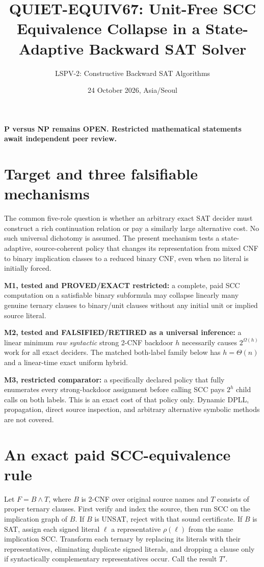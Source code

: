 \documentclass[11pt]{article}
\title{QUIET-EQUIV67: Unit-Free SCC Equivalence Collapse in a State-Adaptive Backward SAT Solver}
\author{LSPV-2: Constructive Backward SAT Algorithms}
\date{24 October 2026, Asia/Seoul}
\begin{document}
\maketitle
\begin{center}\textbf{P versus NP remains OPEN. Restricted mathematical statements await independent peer review.}\end{center}

\section{Target and three falsifiable mechanisms}
The common five-role question is whether an arbitrary exact SAT decider must construct a rich continuation relation or pay a similarly large alternative cost. No such universal dichotomy is assumed. The present mechanism tests a state-adaptive, source-coherent policy that changes its representation from mixed CNF to binary implication classes to a reduced binary CNF, even when no literal is initially forced.

\noindent\textbf{M1, tested and PROVED/EXACT restricted:} a complete, paid SCC computation on a satisfiable binary subformula may collapse linearly many genuine ternary clauses to binary/unit clauses without any initial unit or implied source literal.

\noindent\textbf{M2, tested and FALSIFIED/RETIRED as a universal inference:} a linear minimum \emph{raw syntactic} strong 2-CNF backdoor $h$ necessarily causes $2^{\Omega(h)}$ work for all exact deciders. The matched both-label family below has $h=\Theta(n)$ and a linear-time exact uniform hybrid.

\noindent\textbf{M3, restricted comparator:} a specifically declared policy that fully enumerates every strong-backdoor assignment before calling SCC pays $2^h$ child calls on both labels. This is an exact cost of that policy only. Dynamic DPLL, propagation, direct source inspection, and arbitrary alternative symbolic methods are not covered.

\section{An exact paid SCC-equivalence rule}
Let $F=B\wedge T$, where $B$ is 2-CNF over original source names and $T$ consists of proper ternary clauses. First verify and index the source, then run SCC on the implication graph of $B$. If $B$ is UNSAT, reject with that sound certificate. If $B$ is SAT, assign each signed literal $\ell$ a representative $\rho(\ell)$ from the same implication SCC. Transform each ternary by replacing its literals with their representatives, eliminating duplicate signed literals, and dropping a clause only if syntactically complementary representatives occur. Call the result $T'$.
\end{document}
